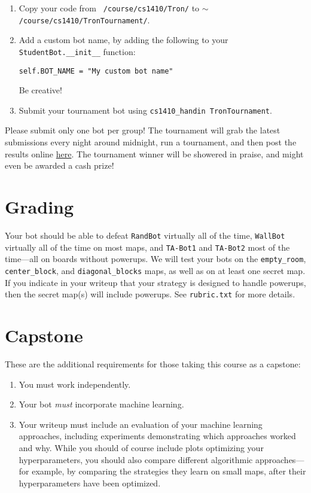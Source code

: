 \documentclass{article}
\begin{document}
\begin{enumerate}
\item Copy your code from \texttt{~/course/cs1410/Tron/} to
  \texttt{$\sim$/course/cs1410/TronTournament/}.

\item Add a custom bot name,
  by adding the following to your \texttt{StudentBot.\_\_init\_\_} function:
    
  \hspace*{6mm} \texttt{self.BOT\_NAME = "My custom bot name"}

  Be creative!

\item Submit your tournament bot using \texttt{cs1410\_handin TronTournament}.
\end{enumerate}

Please submit only one bot per group!  The tournament will grab the
latest submissions every night around midnight, run a tournament, and
then post the results online
\href{http://cs.brown.edu/courses/csci1410/tron_results.html}{here}.
%
The tournament winner will be showered in praise, and might even be awarded a cash prize!


\section{Grading}
Your bot should be able to defeat \texttt{RandBot} virtually all of
the time, \texttt{WallBot} virtually all of the time on most maps, and
\texttt{TA-Bot1} and \texttt{TA-Bot2} most of the time---all on boards
without powerups.  We will test your bots on the \texttt{empty\_room},
\texttt{center\_block}, and \texttt{diagonal\_blocks} maps, as well as
on at least one secret map.  If you indicate in your writeup that your
strategy is designed to handle powerups, then the secret map(s) will
include powerups.  See \texttt{rubric.txt} for more details.


\section{Capstone}
These are the additional requirements for those taking this course as a capstone:

\begin{enumerate}
\item You must work independently.

\item Your bot \emph{must\/} incorporate machine learning.

\item Your writeup must include an evaluation of your machine learning
  approaches, including experiments demonstrating which approaches
  worked and why.  While you should of course include plots optimizing
  your hyperparameters, you should also compare different algorithmic
  approaches---for example, by comparing the strategies they learn on
  small maps, after their hyperparameters have been optimized.
\end{enumerate} 
\end{document}
